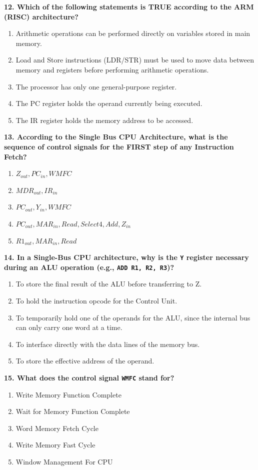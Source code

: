 \documentclass[12pt]{article}
\begin{document}
\textbf{12. Which of the following statements is TRUE according to the ARM (RISC) architecture?}
\begin{enumerate}[label=\Alph*.]
    \item Arithmetic operations can be performed directly on variables stored in main memory.
    \item Load and Store instructions (LDR/STR) must be used to move data between memory and registers before performing arithmetic operations.
    \item The processor has only one general-purpose register.
    \item The PC register holds the operand currently being executed.
    \item The IR register holds the memory address to be accessed.
\end{enumerate}

\textbf{13. According to the Single Bus CPU Architecture, what is the sequence of control signals for the FIRST step of any Instruction Fetch?}
\begin{enumerate}[label=\Alph*.]
    \item $Z_{out}, PC_{in}, WMFC$
    \item $MDR_{out}, IR_{in}$
    \item $PC_{out}, Y_{in}, WMFC$
    \item $PC_{out}, MAR_{in}, Read, Select4, Add, Z_{in}$
    \item $R1_{out}, MAR_{in}, Read$
\end{enumerate}

\textbf{14. In a Single-Bus CPU architecture, why is the \texttt{Y} register necessary during an ALU operation (e.g., \texttt{ADD R1, R2, R3})?}
\begin{enumerate}[label=\Alph*.]
    \item To store the final result of the ALU before transferring to Z.
    \item To hold the instruction opcode for the Control Unit.
    \item To temporarily hold one of the operands for the ALU, since the internal bus can only carry one word at a time.
    \item To interface directly with the data lines of the memory bus.
    \item To store the effective address of the operand.
\end{enumerate}

\textbf{15. What does the control signal \texttt{WMFC} stand for?}
\begin{enumerate}[label=\Alph*.]
    \item Write Memory Function Complete
    \item Wait for Memory Function Complete
    \item Word Memory Fetch Cycle
    \item Write Memory Fast Cycle
    \item Window Management For CPU
\end{enumerate}
\end{document}
